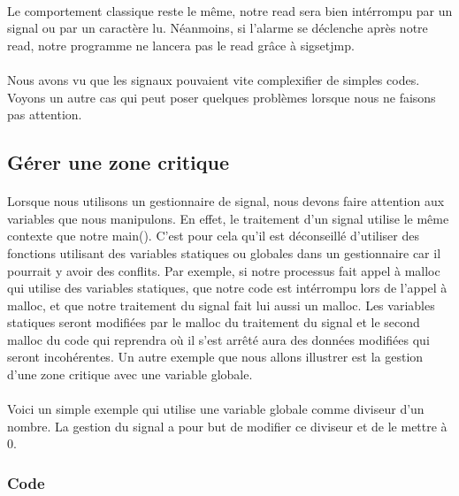 \documentclass{article}
\begin{document}
\paragraph{} Le comportement classique reste le même, notre read sera bien intérrompu par un signal ou par un caractère lu. Néanmoins, si l'alarme se déclenche après notre read, 
notre programme ne lancera pas le read grâce à sigsetjmp.

\paragraph{} Nous avons vu que les signaux pouvaient vite complexifier de simples codes. Voyons un autre cas qui peut poser quelques problèmes lorsque nous ne faisons pas attention.

\subsection{Gérer une zone critique}

\paragraph{} Lorsque nous utilisons un gestionnaire de signal, nous devons faire attention aux variables que nous manipulons. En effet, le traitement d'un signal utilise le 
même contexte que notre main(). C'est pour cela qu'il est déconseillé d'utiliser des fonctions utilisant des variables statiques ou globales dans un gestionnaire car il pourrait y avoir 
des conflits. Par exemple, si notre processus fait appel à malloc qui utilise des variables statiques, que notre code est intérrompu lors de l'appel à malloc, et que notre traitement
du signal fait lui aussi un malloc. Les variables statiques seront modifiées par le malloc du traitement du signal et le second malloc du code qui reprendra où il s'est arrêté 
aura des données modifiées qui seront incohérentes. Un autre exemple que nous allons illustrer est la gestion d'une zone critique avec une variable globale.

\paragraph{} Voici un simple exemple qui utilise une variable globale comme diviseur d'un nombre. La gestion du signal a pour but de modifier ce diviseur et de le mettre à 0.

\subsubsection*{Code}
\end{document}
